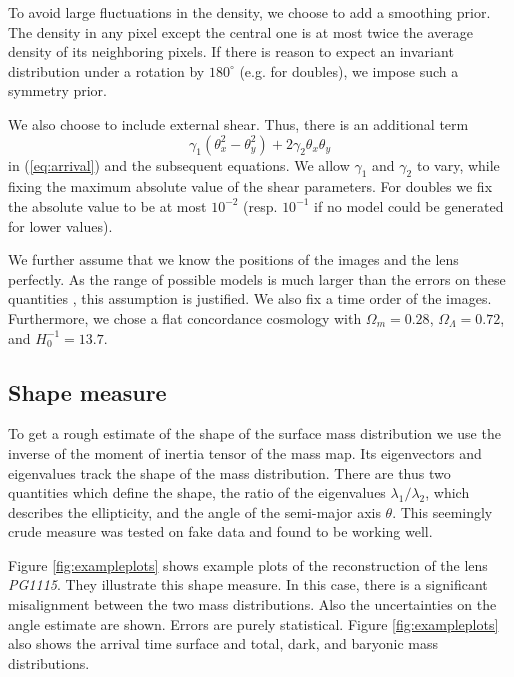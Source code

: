\documentclass[10pt]{article}
\begin{document}
To avoid large fluctuations in the density, we choose to add a smoothing prior. The density in any pixel except the central one is at most twice the average density of its neighboring pixels. If there is reason to expect an invariant distribution under a rotation by $180^{\circ}$ (e.g. for doubles), we impose such a symmetry prior.

We also choose to include external shear. Thus, there is an additional term
\begin{equation}
  \gamma_{1}\left(\theta_{x}^{2}-\theta_{y}^{2}\right)+2\gamma_{2}\theta_{x}\theta_{y}
\end{equation}
in (\ref{eq:arrival}) and the subsequent equations. We allow $\gamma_{1}$ and $\gamma_{2}$ to vary, while fixing the maximum absolute value of the shear parameters. For doubles we fix the absolute value to be at most $10^{-2}$ (resp. $10^{-1}$ if no model could be generated for lower values).

We further assume that we know the positions of the images and the lens perfectly. As the range of possible models is much larger than the errors on these quantities \citep{2006ApJ...650L..17S}, this assumption is justified. We also fix a time order of the images. Furthermore, we chose a flat concordance cosmology with $\Omega_{m}=0.28$, $\Omega_{\Lambda}=0.72$, and $H_{0}^{-1}=13.7$.

\subsection{Shape measure}

To get a rough estimate of the shape of the surface mass distribution we use the inverse of the moment of inertia tensor of the mass map. Its eigenvectors and eigenvalues track the shape of the mass distribution. There are thus two quantities which define the shape, the ratio of the eigenvalues $\lambda_{1}/\lambda_{2}$, which describes the ellipticity, and the angle of the semi-major axis $\theta$. This seemingly crude measure was tested on fake data and found to be working well.

Figure \ref{fig:exampleplots} shows example plots of the reconstruction of the lens \textit{PG1115}. They illustrate this shape measure. In this case, there is a significant misalignment between the two mass distributions. Also the uncertainties on the angle estimate are shown. Errors are purely statistical. Figure \ref{fig:exampleplots} also shows the arrival time surface and total, dark, and baryonic mass distributions.
\end{document}
